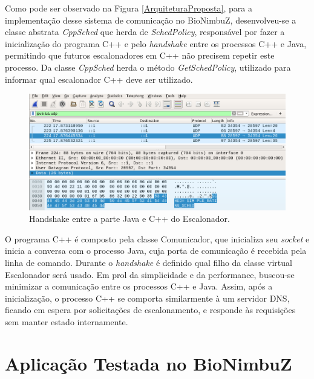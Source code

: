 

Como pode ser observado na Figura \ref{ArquiteturaProposta}, para a implementação desse sistema de comunicação no BioNimbuZ, desenvolveu-se a classe abstrata \textit{CppSched} que herda de \textit{SchedPolicy}, responsável por fazer a inicialização do programa C++ e pelo \textit{handshake} entre os processos C++ e Java, permitindo que futuros escalonadores em C++ não precisem repetir este processo. Da classe \textit{CppSched} herda o método \textit{GetSchedPolicy}, utilizado para informar qual escalonador C++ deve ser utilizado.

\begin{figure}[htbp]
	\centerline{\includegraphics[width=13cm]{img/Handshake3.png}}
	\caption{Handshake entre a parte Java e C++ do Escalonador.}
	\label{Handshake}
\end{figure}

O programa C++ é composto pela classe Comunicador, que inicializa seu \textit{socket} e inicia a conversa com o processo Java, cuja porta de comunicação é recebida pela linha de comando. Durante o \textit{handshake} é definido qual filho da classe virtual Escalonador será usado. Em prol da simplicidade e da performance, buscou-se minimizar a comunicação entre os processos C++ e Java. Assim, após a inicialização, o processo C++ se comporta similarmente à um servidor \acrshort{DNS}\cite{dns_rfc}, ficando em espera por solicitações de escalonamento, e responde às requisições sem manter estado internamente.

\section{Aplicação Testada no BioNimbuZ}

